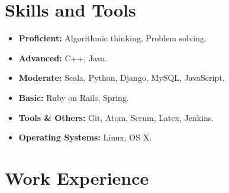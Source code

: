 \documentclass[a4paper,11pt]{article} %
\begin{document}

\section{Skills and Tools}
\begin{itemize}
 \item \textbf{Proficient:} Algorithmic thinking, Problem solving.
 \item \textbf{Advanced:} C++, Java.
 \item \textbf{Moderate:} Scala, Python, Django, MySQL, JavaScript.
 \item \textbf{Basic:} Ruby on Rails, Spring.
 \item \textbf{Tools \& Others:} Git, Atom, Scrum, Latex, Jenkins.
 \item \textbf{Operating Systems:} Linux, OS X.
\end{itemize}



\section{Work Experience}
\end{document}
